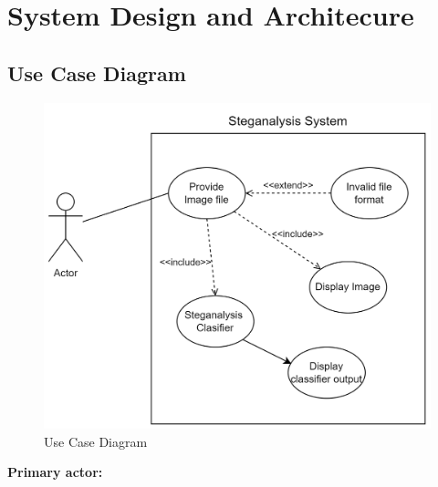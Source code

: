 \chapter{System Design and Architecure}
\section{Use Case Diagram}
\begin{figure}[H]
    \centering
    \vspace{1.5cm}
    \includegraphics[width=120mm]{./img/useCase.png}
    \caption{Use Case Diagram}
\end{figure}
\clearpage
\begin{flushleft}
\large{\textbf{Primary actor:}}  
\end{flushleft}

